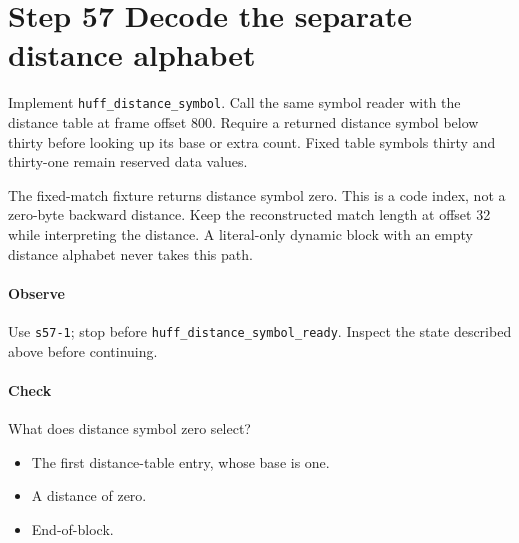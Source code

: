 \section{Step 57 Decode the separate distance alphabet}\label{png-huff-s57}
Implement \texttt{huff\_distance\_symbol}. Call the same symbol reader with the distance table at frame offset 800. Require a returned distance symbol below thirty before looking up its base or extra count. Fixed table symbols thirty and thirty-one remain reserved data values.

The fixed-match fixture returns distance symbol zero. This is a code index, not a zero-byte backward distance. Keep the reconstructed match length at offset 32 while interpreting the distance. A literal-only dynamic block with an empty distance alphabet never takes this path.

\paragraph{Observe} Use \texttt{s57-1}; stop before \texttt{huff\_distance\_symbol\_ready}. Inspect the state described above before continuing.

\paragraph{Check} What does distance symbol zero select?
\begin{itemize}
  \item[A.] The first distance-table entry, whose base is one.
  \item[B.] A distance of zero.
  \item[C.] End-of-block.
\end{itemize}
